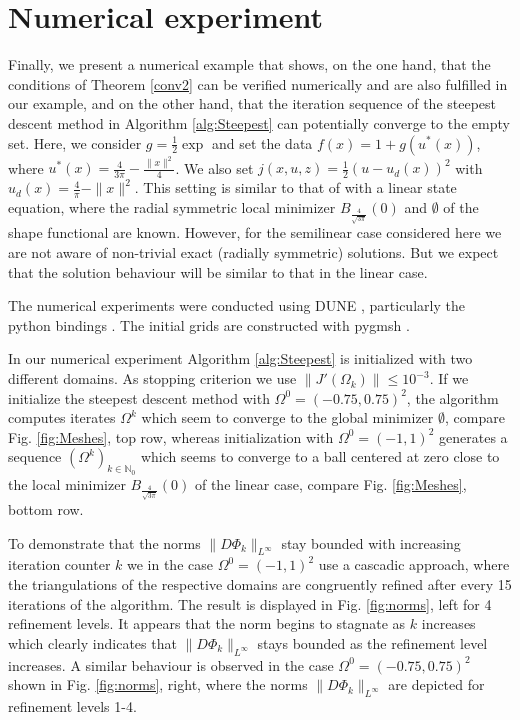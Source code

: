 \documentclass[a4paper,10pt]{article}
\theoremstyle{plain}
\theoremstyle{plain}
\numberwithin{equation}{section}
\begin{document}
\section{Numerical experiment}
Finally, we present a numerical example that shows, on the one hand, that the conditions of Theorem \ref{conv2} can be verified numerically and are also fulfilled in our example, and on the other hand, that the iteration sequence of the steepest descent method in Algorithm \ref{alg:Steepest} can potentially converge to the empty set.
Here, we consider $g = \frac{1}{2}\exp$ and set the data $f(x) = 1 + g( u^*(x) )$, where $u^*(x) = \frac{4}{{3\pi}} - \frac{\|x\|^2}{4}$.
We also set $j(x,u,z) = \frac{1}{2}(u-u_d(x))^2$ with $u_d(x) = \frac{4}{\pi}-\|x\|^2$.
This setting is similar to that of \cite[Experiment 1]{DHH25-convergence} with a linear state equation, where the radial symmetric local minimizer $B_{\frac{4}{\sqrt{3\pi}}}(0)$ and $\emptyset$ of the shape functional are known. However, for the semilinear case considered here we are not aware of non-trivial exact (radially symmetric) solutions. But we expect that the solution behaviour will be similar to that in the linear case. 

The numerical experiments were conducted using DUNE \cite{duneReference}, particularly the python bindings \cite{DunePython1,DunePython2}.
The initial grids are constructed with pygmsh \cite{pygmsh}.



In our numerical experiment Algorithm \ref{alg:Steepest} is initialized with two different domains. As stopping criterion we use $\|J'(\Omega_k)\| \leq 10^{-3}$. If we initialize the steepest descent method with $\Omega^0 = (-0.75,0.75)^2$, the algorithm computes iterates $\Omega^k$ which seem to converge to the global minimizer $\emptyset$, compare Fig. \ref{fig:Meshes}, top row, whereas initialization with $\Omega^0 =(-1,1)^2$ generates a sequence $(\Omega^k)_{k\in\mathbb{N}_0}$ which seems to converge to a ball centered at zero close to the local minimizer $B_{\frac{4}{\sqrt{3\pi}}}(0)$ of the linear case, compare Fig. \ref{fig:Meshes}, bottom row.

To demonstrate that the norms $\|D\Phi_k\|_{L^\infty}$ stay bounded with increasing iteration counter $k$ we in the case $\Omega^0 = (-1,1)^2$ use a cascadic approach, where the triangulations of the respective domains are congruently refined after every 15 iterations of the algorithm. The result is displayed in Fig. \ref{fig:norms}, left for 4 refinement levels. It appears that the norm begins to stagnate as $k$ increases which clearly indicates that $\|D\Phi_k\|_{L^\infty}$ stays bounded as the refinement level increases. A similar behaviour is observed in the case $\Omega^0 = (-0.75,0.75)^2$ shown in Fig. \ref{fig:norms}, right, where the norms $\|D\Phi_k\|_{L^\infty}$ are depicted for refinement levels 1-4.
\end{document}
